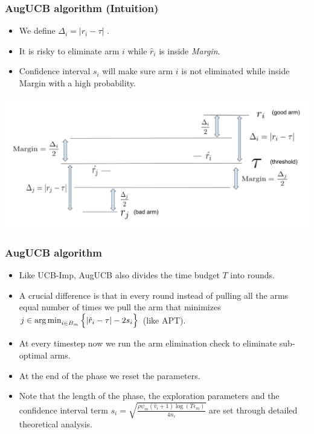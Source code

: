 \begin{frame}
\frametitle{AugUCB algorithm (Intuition)}
\begin{itemize}
\item We define $\Delta_i = |r_i - \tau| $ . 
\item It is risky to eliminate arm $i$ while $\hat{r}_i$ is inside \emph{Margin}. 
\item Confidence interval $s_i$ will make sure arm $i$ is not eliminated while inside Margin with a high probability. 


\end{itemize}
\includegraphics[scale=0.278]{img/SeminarThresholdBandit.png}
\end{frame}

\begin{frame}
\frametitle{AugUCB algorithm}
\begin{itemize}
\item<1-> Like UCB-Imp, AugUCB also divides the time budget $T$ into rounds.
\item<2-> A crucial difference is that in every round instead of pulling all the arms equal number of times we pull the arm that minimizes $j\in\operatorname*{arg\,min}_{i\in B_{m}}\Big\lbrace |\hat{r}_{i} - \tau | - 2s_{i}\Big\rbrace$ (like APT). 
\item<3-> At every timestep now we run the arm elimination check to eliminate sub-optimal arms.
\item<4-> At the end of the phase we reset the parameters. 
\item<5-> Note that the length of the phase, the exploration parameters and the confidence interval term $s_i  = \sqrt{\frac{\rho\psi_m (\hat{v}_{i}+1) \log ( T \epsilon_{m})}{4 n_{i}}}$ are set through detailed theoretical analysis. 
\end{itemize}
\end{frame}

